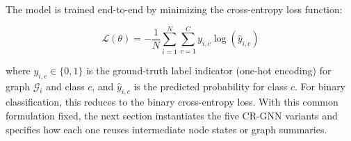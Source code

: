 The model is trained end-to-end by minimizing the cross-entropy loss function:

\begin{equation}
\mathcal{L}(\theta) = -\frac{1}{N} \sum_{i=1}^{N} \sum_{c=1}^{C} y_{i,c} \log(\hat{y}_{i,c})
\end{equation}

where $y_{i,c} \in \{0, 1\}$ is the ground-truth label indicator (one-hot encoding) for graph $\mathcal{G}_i$ and class $c$, and $\hat{y}_{i,c}$ is the predicted probability for class $c$. For binary classification, this reduces to the binary cross-entropy loss. With this common formulation fixed, the next section instantiates the five CR-GNN variants and specifies how each one reuses intermediate node states or graph summaries.
